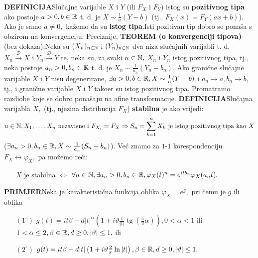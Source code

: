 \documentclass{article}
\newcommand{\tg}{\operatorname{tg}}
\begin{document}
\textbf{DEFINICIJA}\newline Slučajne varijable \(X\) i \(Y\) (ili \(F_X\) i \(F_Y\)) istog su \textbf{pozitivnog tipa} ako postoje \(a>0,b\in\Bbb R\) t. d. je \(X\sim\frac1a(Y-b)\) (tj., \(F_X(x)=F_Y(ax+b)\)). Ako je samo \(a\ne0,\) kažemo da su \textbf{istog tipa}.\newline Isti pozitivan tip dobro se ponaša s obzirom na konvergenciju. Preciznije,\newline\newline
\textbf{TEOREM (o konvergenciji tipova)} (bez dokaza):\newline Neka su \((X_n)_{n\in\Bbb N}\) i \((Y_n)_{n\in\Bbb N}\) dva niza slučajnih varijabli t. d. \(X_n\overset{\mathcal D}{\longrightarrow}X\) i \(Y_n\overset{\mathcal D}{\longrightarrow}Y\) te, neka su, za svaki \(n\in\Bbb N,\) \(X_n\) i \(Y_n\) istog pozitivnog tipa, tj., neka postoje \(a_n>0,b_n\in\Bbb R\) t. d. je \(X_n\sim\frac1{a_n}(Y_n-b_n).\) Ako granične slučajne varijable \(X\) i \(Y\) nisu degenerirane, \(\exists a>0,b\in\Bbb R,X\sim\frac1a(Y-b)\) i \(a_n\to a,b_n\to b,\) tj., i granične varijable \(X\) i \(Y\) tako\dj{}er su istog pozitivnog tipa. \newline\newline Promatramo razdiobe koje se dobro ponašaju na afine transformacije.\newline\newline
\textbf{DEFINICIJA}\newline Slučajna varijabla \(X,\) (tj., njezina distribucija \(F_X\)) \textbf{stabilna} je ako vrijedi: \[n\in\Bbb N,X_1,\ldots,X_n\text{ nezavisne i }F_{X_i}=F_X\Rightarrow S_n=\sum_{k=1}^nX_k\text{ je istog pozitivnog tipa kao }X\] (\(\exists a_n>0,b_n\in\Bbb R,X\sim\frac1{a_n}(S_n-b_n)\)).\newline\newline
Već znamo za \(1\)-\(1\) korespondenciju \(F_X\leftrightarrow\varphi_X,\) pa možemo reći: 
\begin{enumerate}
    \item[\ding{233}] \(X\) je stabilna \(\Leftrightarrow\) \(\forall n\in\Bbb N,\exists a_n>0,b_n\in\Bbb R,\varphi_X(t)^n=e^{itb_n}\varphi_X(a_nt).\) 
\end{enumerate}
\textbf{PRIMJER}\newline Neka je karakteristična funkcija oblika \(\varphi_X=e^g,\) pri čemu je \(g\) ili oblika \begin{enumerate}
    \item[\((1^\circ)\)] \(g(t)=it\beta-d|t|^\alpha\left(1+i\vartheta\frac{t}{|t|}\tg\left(\frac\pi2\alpha\right)\right),\)\newline \(0<\alpha<1\) ili \(1<\alpha\le2,\beta\in\Bbb R, d\ge0,|\vartheta|\le1,\) ili
    \item[\((2^\circ)\)] \(g(t)=it\beta-d|t|\left(1+i\vartheta\frac2\pi\ln|t|\right),\beta\in\Bbb R,d\ge0,|\vartheta|\le1.\)
\end{enumerate}
\end{document}
